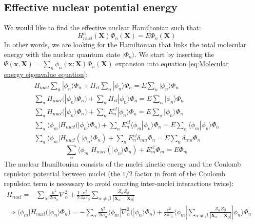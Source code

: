 \documentclass[11pt,a4paper]{article}
\begin{document}
\subsection{Effective nuclear potential energy}
We would like to find the effective nuclear Hamiltonian such that:
\begin{equation*}
	H_{nucl}^n(\mathbf{X}) \Phi_n(\mathbf{X}) = E \Phi_n(\mathbf{X})
\end{equation*}
In other words, we are looking for the Hamiltonian that links the total molecular energy with the nuclear quantum state $|\Phi_n\rangle$. We start by inserting the $\Psi(\mathbf{x}, \mathbf{X}) = \sum_n \phi_n(\mathbf{x}; \mathbf{X}) \Phi_n(\mathbf{X})$ expansion into equation \eqref{eq:Molecular energy eigenvalue equation}:
\begin{equation*}
	\begin{gathered}
		H_{nucl} \sum_n |\phi_n\rangle \Phi_n + H_{el} \sum_n |\phi_n\rangle \Phi_n = E \sum_n |\phi_n\rangle \Phi_n \\[6pt]
		\sum_n H_{nucl} (|\phi_n\rangle \Phi_n) + \sum_n H_{el} |\phi_n\rangle \Phi_n = E \sum_n |\phi_n\rangle \Phi_n \\[6pt]
		\sum_n H_{nucl} (|\phi_n\rangle \Phi_n) + \sum_n E_n^{el} |\phi_n\rangle \Phi_n = E \sum_n |\phi_n\rangle \Phi_n \\[6pt]
		\sum_n \langle\phi_m | H_{nucl} (|\phi_n\rangle \Phi_n) + \sum_n E_n^{el} \langle\phi_m | \phi_n\rangle \Phi_n = E \sum_n \langle\phi_m | \phi_n\rangle \Phi_n \\[6pt]
		\sum_n \langle\phi_m | H_{nucl} (|\phi_n\rangle \Phi_n) + \sum_n E_n^{el} \delta_{nm} \Phi_n = E \sum_n \delta_{nm} \Phi_n
	\end{gathered}
\end{equation*}
\begin{equation}
	\label{eq:Raw effective nuclear energy}
	\sum_n \langle\phi_m | H_{nucl} (|\phi_n\rangle \Phi_n) + E_m^{el} \Phi_m = E \Phi_m
\end{equation}
The nuclear Hamiltonian consists of the nuclei kinetic energy and the Coulomb repulsion potential between nuclei (the $1/2$ factor in front of the Coulomb repulsion term is necessary to avoid counting inter-nuclei interactions twice):
\begin{equation*}
	\begin{gathered}
		H_{nucl} = -\sum_\alpha \frac{\hbar^2}{2m_\alpha} \nabla_\alpha^2 + \frac{1}{2} \frac{e^2}{4\pi\varepsilon_0} \sum_{\alpha \neq \beta} \frac{Z_\alpha Z_\beta}{|\mathbf{X}_\alpha - \mathbf{X}_\beta|} \\[6pt]
		\Rightarrow \langle\phi_m | H_{nucl} (|\phi_n\rangle \Phi_n) = -\sum_\alpha \frac{\hbar^2}{2m_\alpha} \langle\phi_m | \nabla_\alpha^2 (|\phi_n\rangle \Phi_n) + \frac{e^2}{8\pi\varepsilon_0} \langle\phi_m | \sum_{\alpha \neq \beta} \frac{Z_\alpha Z_\beta}{|\mathbf{X}_\alpha - \mathbf{X}_\beta|} |\phi_n\rangle \Phi_n
	\end{gathered}
\end{equation*}
\end{document}
